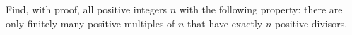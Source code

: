 Find, with proof, all positive integers $n$ with the following property: there are only finitely many positive multiples of $n$ that have exactly $n$ positive divisors.
